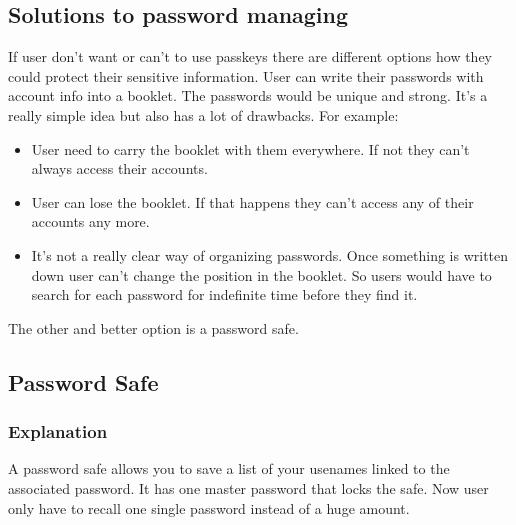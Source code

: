 \documentclass[conference]{IEEEtran}
\begin{document}
\subsection{Solutions to password managing}
If user don't want or can't to use passkeys there are different options how they could protect their sensitive information. User can write their passwords with account info into a booklet. The passwords would be unique and strong. It's a really simple idea but also has a lot of drawbacks. 
For example:
\begin{itemize}
\item User need to carry the booklet with them everywhere. If not they can't always access their accounts.
\item User can lose the booklet. If that happens they can't access any of their accounts any more.
\item It's not a really clear way of organizing passwords. Once something is written down user can't change the position in the booklet. So users would have to search for each password for indefinite time before they find it.
\end{itemize}
The other and better option is a password safe.  

\subsection{Password Safe}
\subsubsection{Explanation}
A password safe allows you to save a list of your usenames linked to the associated password. It has one master password that locks the safe. Now user only have to recall one single password instead of a huge amount.
\end{document}
